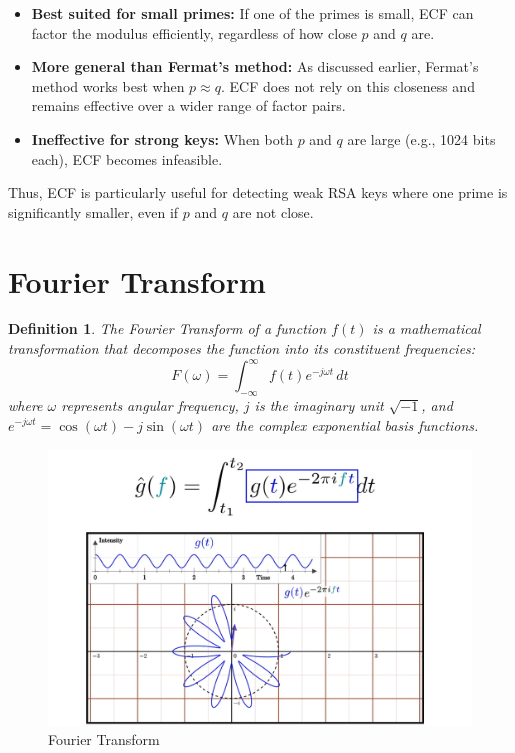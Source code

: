 \documentclass{article}
\newtheorem{definition}{Definition}
\begin{document}
\begin{itemize}
    \item \textbf{Best suited for small primes:} If one of the primes is small, ECF can factor the modulus efficiently, regardless of how close \( p \) and \( q \) are.
    \item \textbf{More general than Fermat's method:} As discussed earlier, Fermat's method works best when \( p \approx q \). ECF does not rely on this closeness and remains effective over a wider range of factor pairs.
    \item \textbf{Ineffective for strong keys:} When both \( p \) and \( q \) are large (e.g., 1024 bits each), ECF becomes infeasible.
\end{itemize}

\noindent Thus, ECF is particularly useful for detecting weak RSA keys where one prime is significantly smaller, even if \( p \) and \( q \) are not close.


\section{Fourier Transform}

\begin{definition}
    The Fourier Transform of a function $f(t)$ is a mathematical transformation that decomposes the function into its constituent frequencies:
    \[
        F(\omega) = \int_{-\infty}^{\infty} f(t) e^{-j\omega t} \, dt
    \]
    where $\omega$ represents angular frequency, $j$ is the imaginary unit $\sqrt{-1}$, and $e^{-j\omega t} = \cos(\omega t) - j\sin(\omega t)$ are the complex exponential basis functions.
\end{definition}

\begin{figure}[!ht]
    \centering
    \includegraphics[width=\textwidth]{./pics/convolv.png}
    \caption{Fourier Transform}
    \label{fig:fourier_transform}
\end{figure}
\end{document}

